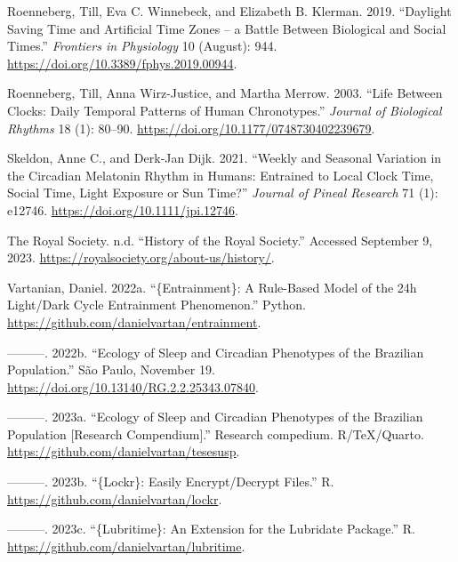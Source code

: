 \documentclass[
  12pt,
  a4paper,
  oneside]{tesesusp}
\newlength{\cslhangindent}
\newlength{\cslentryspacingunit} %
\newenvironment{CSLReferences}[2] %
 {%
  \setlength{\parindent}{0pt}
  \ifodd #1
  \let\oldpar\par
  \def\par{\hangindent=\cslhangindent\oldpar}
  \fi
  \setlength{\parskip}{#2\cslentryspacingunit}
 }%
 {}
\begin{document}
\begin{CSLReferences}{1}{0}
\leavevmode{}%
Roenneberg, Till, Eva C. Winnebeck, and Elizabeth B. Klerman. 2019.
{``Daylight Saving Time and Artificial Time Zones -- a Battle Between
Biological and Social Times.''} \emph{Frontiers in Physiology} 10
(August): 944. \url{https://doi.org/10.3389/fphys.2019.00944}.

\leavevmode{}%
Roenneberg, Till, Anna Wirz-Justice, and Martha Merrow. 2003. {``Life
Between Clocks: Daily Temporal Patterns of Human Chronotypes.''}
\emph{Journal of Biological Rhythms} 18 (1): 80--90.
\url{https://doi.org/10.1177/0748730402239679}.

\leavevmode{}%
Skeldon, Anne C., and Derk‐Jan Dijk. 2021. {``Weekly and Seasonal
Variation in the Circadian Melatonin Rhythm in Humans: Entrained to
Local Clock Time, Social Time, Light Exposure or Sun Time?''}
\emph{Journal of Pineal Research} 71 (1): e12746.
\url{https://doi.org/10.1111/jpi.12746}.

\leavevmode{}%
The Royal Society. n.d. {``History of the Royal Society.''} Accessed
September 9, 2023. \url{https://royalsociety.org/about-us/history/}.

\leavevmode{}%
Vartanian, Daniel. 2022a. {``\{Entrainment\}: A Rule-Based Model of the
24h Light/Dark Cycle Entrainment Phenomenon.''} Python.
\url{https://github.com/danielvartan/entrainment}.

\leavevmode{}%
---------. 2022b. {``Ecology of Sleep and Circadian Phenotypes of the
Brazilian Population.''} São Paulo, November 19.
\url{https://doi.org/10.13140/RG.2.2.25343.07840}.

\leavevmode{}%
---------. 2023a. {``Ecology of Sleep and Circadian Phenotypes of the
Brazilian Population {[}Research Compendium{]}.''} Research compedium.
R/TeX/Quarto. \url{https://github.com/danielvartan/tesesusp}.

\leavevmode{}%
---------. 2023b. {``\{Lockr\}: Easily Encrypt/Decrypt Files.''} R.
\url{https://github.com/danielvartan/lockr}.

\leavevmode{}%
---------. 2023c. {``\{Lubritime\}: An Extension for the Lubridate
Package.''} R. \url{https://github.com/danielvartan/lubritime}.


\end{CSLReferences}
\end{document}

